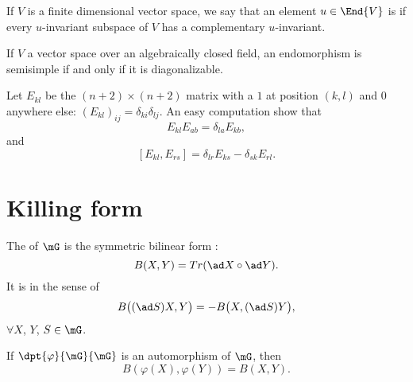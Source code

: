 \begin{definition}
    If $V$ is a finite dimensional vector space, we say that an element $u\in\End{V}$ is \label{pg:def_semisimple} if every \( u\)-invariant subspace of \( V\) has a complementary \( u\)-invariant.
\end{definition}

\begin{proposition}
    If \( V\) a vector space over an algebraically closed field, an endomorphism is semisimple if and only if it is diagonalizable.
\end{proposition}

\label{pg:E_ij}Let $E_{kl}$ be the $(n+2)\times(n+2)$ matrix with a $1$ at position $(k,l)$ and $0$ anywhere else: $(E_{kl})_{ij}=\delta_{ki}\delta_{lj}$. An easy computation show that 
\begin{equation}        \label{EqFormMulEmtr}       %
    E_{kl}E_{ab}=\delta_{la}E_{kb},
\end{equation}
and
\begin{equation}\label{comm_de_E}
    [E_{kl},E_{rs}]=\delta_{lr}E_{ks}-\delta_{sk}E_{rl}.
\end{equation}

\section{Killing form}

The  of $\mG$ is the symmetric bilinear form :
\begin{equation}
             B(X,Y)=Tr(\ad X\circ \ad Y).
\end{equation}
It is  in the sense of
\begin{equation}                        \label{eq:Killing_invariant}
     B\big((\ad S)X,Y\big)=-B\big(X,(\ad S)Y\big),
\end{equation}
$\forall X$, $Y$, $S\in\mG$.

\begin{proposition} \label{PropAutomInvarB}
If $\dpt{\varphi}{\mG}{\mG}$ is an automorphism of $\mG$, then 
\[
   B(\varphi(X),\varphi(Y))=B(X,Y).
\]
\label{prop:auto_2}
\end{proposition}
 
